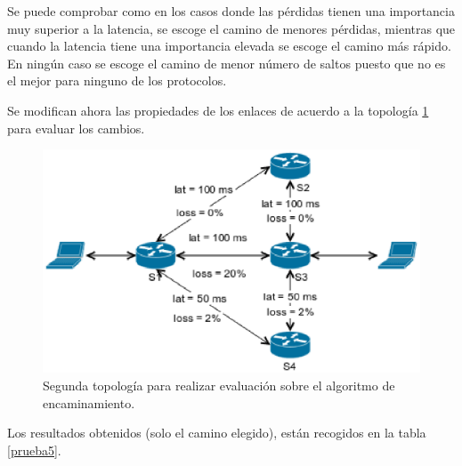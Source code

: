 \documentclass[a4paper,11pt]{book}
\begin{document}
Se puede comprobar como en los casos donde las pérdidas tienen una importancia muy superior a la latencia, se escoge el camino de menores pérdidas, mientras que cuando la latencia tiene una importancia elevada se escoge el camino más rápido. En ningún caso se escoge el camino de menor número de saltos puesto que no es el mejor para ninguno de los protocolos. 

Se modifican ahora las propiedades de los enlaces de acuerdo a la topología \ref{topoDijkstra2} para evaluar los cambios.

\begin{figure}[tb]
\centering
\includegraphics[scale=0.7]{./figuras/topoDijkstra2}
\caption{Segunda topología para realizar evaluación sobre el algoritmo de encaminamiento.}
\label{topoDijkstra2}
\end{figure}

Los resultados obtenidos (solo el camino elegido), están recogidos en la tabla \ref{prueba5}.
\end{document}
